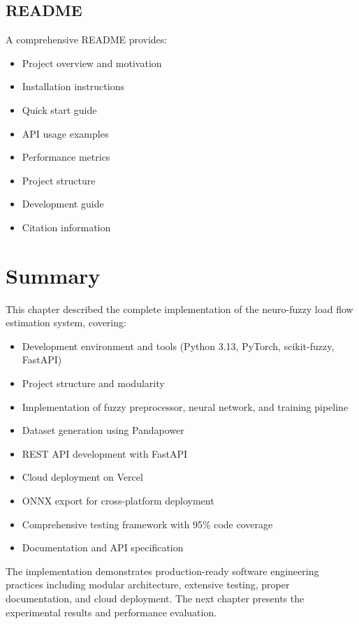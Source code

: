 \documentclass[12pt,a4paper]{report}
\begin{document}
\subsection{README}

A comprehensive README provides:
\begin{itemize}
    \item Project overview and motivation
    \item Installation instructions
    \item Quick start guide
    \item API usage examples
    \item Performance metrics
    \item Project structure
    \item Development guide
    \item Citation information
\end{itemize}

\section{Summary}

This chapter described the complete implementation of the neuro-fuzzy load flow estimation system, covering:

\begin{itemize}
    \item Development environment and tools (Python 3.13, PyTorch, scikit-fuzzy, FastAPI)
    \item Project structure and modularity
    \item Implementation of fuzzy preprocessor, neural network, and training pipeline
    \item Dataset generation using Pandapower
    \item REST API development with FastAPI
    \item Cloud deployment on Vercel
    \item ONNX export for cross-platform deployment
    \item Comprehensive testing framework with 95\% code coverage
    \item Documentation and API specification
\end{itemize}

The implementation demonstrates production-ready software engineering practices including modular architecture, extensive testing, proper documentation, and cloud deployment. The next chapter presents the experimental results and performance evaluation.
\end{document}

